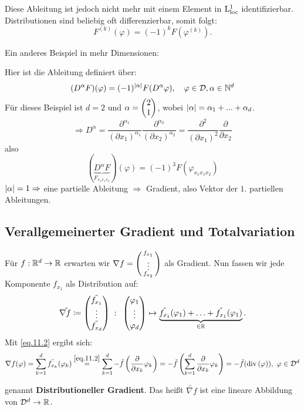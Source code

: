 Diese Ableitung ist jedoch nicht mehr mit einem Element in $\mathrm{L}^1_{\mathrm{loc}}$ identifizierbar.
Distributionen sind beliebig oft differenzierbar, somit folgt:
\[F^{(k)}(\varphi) = (-1)^kF(\varphi^{(k)}).\]

Ein anderes Beispiel in mehr Dimensionen:

Hier ist die Ableitung definiert über:
\[(D^\alpha F)(\varphi) = (-1)^{\left| \alpha \right|}F(D^{\alpha} \varphi), \quad \varphi \in \mathcal{D}, \alpha \in \mathbb N^d\]
Für dieses Beispiel ist $d=2$ und $\alpha = \begin{pmatrix} 2\\1 \end{pmatrix}$, wobei $\left| \alpha \right| = \alpha_1 + ... +\alpha_d$.
\[\Rightarrow D^\alpha = \frac{\partial^{\alpha_1}}{(\partial x_1)^{\alpha_1}}\frac{\partial^{\alpha_2}}{(\partial x_2)^{\alpha_2}} = \frac{\partial^{2}}{(\partial x_1)^{2}} \frac{\partial}{\partial x_2}\]
also
\[(\underbrace{D^\alpha F}_{F_{x_1 x_1 x_2}})(\varphi) = (-1)^{3}F(\varphi_{x_1 x_1 x_2})\]
$\left| \alpha \right|=1 \Rightarrow $ eine partielle Ableitung $\Rightarrow$ Gradient, also Vektor der $1.$ partiellen Ableitungen.

\subsection{Verallgemeinerter Gradient und Totalvariation}

Für $f:\mathbb R^d \to \mathbb R$ erwarten wir $\nabla f = \left( \begin{smallmatrix} f_{x_1} \\ \vdots \\ f_{x_2} \end{smallmatrix} \right)$ als Gradient.
Nun fassen wir jede Komponente $f_{x_1}$ als Distribution auf:
\[
    \tilde{\nabla f} \coloneqq \begin{pmatrix} \tilde{f_{x_1}}\\ \vdots \\ \tilde{f_{x_d}} \end{pmatrix} \;\colon\; \begin{pmatrix} \varphi_1 \\ \vdots \\ \varphi_d \end{pmatrix} \mapsto \underbrace{\tilde{f_{x_1}}(\varphi_1) + \hdots + \tilde{f_{x_1}}(\varphi_1)}_{\in \mathbb R}.
\]
Mit \eqref{eq.11.2} ergibt sich:
\begin{equation}\label{eq.11.3}
    \nabla f(\varphi)
    =\sum_{k=1}^d \tilde{f_{x_k}}(\varphi_k) 
    \overset{\eqref{eq.11.2}}{=} \sum_{k=1}^d - \tilde{f}\left(\frac{\partial}{\partial x_k} \varphi_k \right) 
    = -\tilde{f} \left( \sum_{k=1}^d \frac{\partial}{\partial x_k} \varphi_k \right) 
    = - \tilde f (\mathrm{div\,} (\varphi)), \ \varphi \in \mathcal{D}^d
\end{equation}

genannt \textbf{Distributioneller Gradient}. Das heißt $\tilde{\nabla f}$ ist eine lineare Abbildung von $\mathcal{D}^d \to \mathbb R$.

